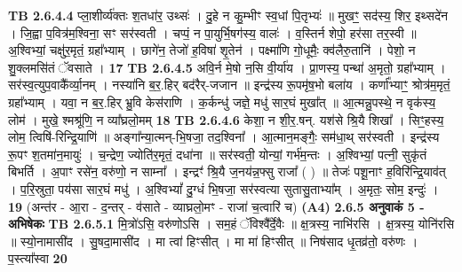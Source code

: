 \documentclass[17pt]{extarticle}
\begin{document}
                  \newline
                                \textbf{ TB 2.6.4.4} \newline
                  प्ला॒शीर्व्य॑क्तः श॒तधा॑र॒ उथ्सः॑ । दु॒हे न कु॒म्भीꣳ स्व॒धां पि॒तृभ्यः॑ ॥ मुखꣳ॒॒ सद॑स्य॒ शिर॒ इथ्सदे॑न । जि॒ह्वा प॒वित्र॑म॒श्विना॒ सꣳ सर॑स्वती । चप्पं॒ न पा॒युर्भि॒षग॑स्य॒ वालः॑ । व॒स्तिर्न शेपो॒ हर॑सा तर॒स्वी ॥ अ॒श्विभ्यां॒ चक्षु॑र॒मृतं॒ ग्रहा᳚भ्याम् । छागे॑न॒ तेजो॑ ह॒विषा॑ शृ॒तेन॑ । पक्ष्मा॑णि गो॒धूमैः॒ क्व॑लैरु॒तानि॑ । पेशो॒ न शु॒क्लमसि॑तं ॅवसाते । \textbf{ 17} \newline
                  \newline
                                \textbf{ TB 2.6.4.5} \newline
                  अवि॒र्न मे॒षो न॒सि वी॒र्या॑य । प्रा॒णस्य॒ पन्था॑ अ॒मृतो॒ ग्रहा᳚भ्याम् । सर॑स्व॒त्युप॒वाकै᳚र्व्या॒नम् । नस्या॑नि ब॒र॒.हिर् बद॑रैर्-जजान ॥ इन्द्र॑स्य रू॒पमृ॑ष॒भो बला॑य । कर्णा᳚भ्याꣳ॒॒ श्रोत्र॑म॒मृतं॒ ग्रहा᳚भ्याम् । यवा॒ न ब॒र॒.हिर् भ्रु॒वि केस॑राणि । क॒र्कन्धु॑ जज्ञे॒ मधु॑ सार॒घं मुखा᳚त् ॥ आ॒त्मन्नु॒पस्थे॒ न वृक॑स्य॒ लोम॑ । मुखे॒ श्मश्रू॑णि॒ न व्या᳚घ्रलो॒मम् \textbf{ 18} \newline
                  \newline
                                \textbf{ TB 2.6.4.6} \newline
                  केशा॒ न शी॒र॒.षन्. यश॑से श्रि॒यै शिखा᳚ । सिꣳ॒॒हस्य॒ लोम॒ त्विषि॑-रिन्द्रि॒याणि॑ ॥ अङ्गा᳚न्या॒त्मन्-भि॒षजा॒ तद॒श्विना᳚ । आ॒त्मान॒मङ्गैः॒ सम॑धा॒थ् सर॑स्वती । इन्द्र॑स्य रू॒पꣳ श॒तमा॑न॒मायुः॑ । च॒न्द्रेण॒ ज्योति॑र॒मृतं॒ दधा॑ना ॥ सर॑स्वती॒ योन्यां॒ गर्भ॑म॒न्तः । अ॒श्विभ्यां॒ पत्नी॒ सुकृ॑तं बिभर्ति । अ॒पाꣳ रसे॑न॒ वरु॑णो॒ न साम्ना᳚ । इन्द्रꣳ॑ श्रि॒यै ज॒नय॑न्न॒फ्सु राजा᳚ ( ) ॥ तेजः॑ पशू॒नाꣳ ह॒विरि॑न्द्रि॒याव॑त् । प॒रि॒स्रुता॒ पय॑सा सार॒घं मधु॑ । अ॒श्विभ्यां᳚ दु॒ग्धं भि॒षजा॒ सर॑स्वत्या सुतासु॒ताभ्या᳚म् । अ॒मृतः॒ सोम॒ इन्दुः॑ । \textbf{ 19} \newline
                  \newline
                                    (अन्त॑र - आ॒रा - द॒न्तर् - व॑साते - व्याघ्रलो॒मꣳ - राजा॑ च॒त्वारि॑ च) \textbf{(A4)} \newline \newline
                \textbf{ 2.6.5     अनुवाकं   5 - अभिषेकः} \newline
                                \textbf{ TB 2.6.5.1} \newline
                  मि॒त्रो॑ऽसि॒ वरु॑णोऽसि । सम॒हं ॅविश्वै᳚र्दे॒वैः ॥ क्ष॒त्रस्य॒ नाभि॑रसि । क्ष॒त्रस्य॒ योनि॑रसि ॥ स्यो॒नामासी॑द । सु॒षदा॒मासी॑द । मा त्वा॑ हिꣳसीत् । मा मा॑ हिꣳसीत् ॥ निष॑साद धृ॒तव्र॑तो॒ वरु॑णः । प॒स्त्या᳚स्वा \textbf{ 20} \newline
\end{document}
